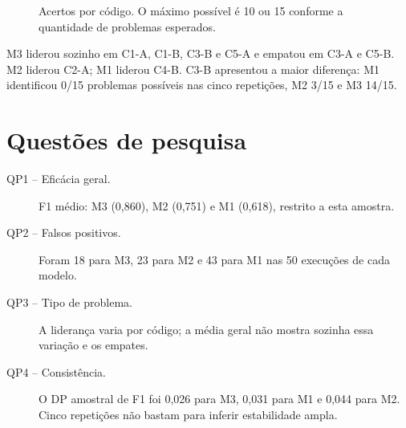 \documentclass[12pt,a4paper]{article}
\begin{document}
\begin{figure}[ht]
\centering
{}
\caption{Acertos por código. O máximo possível é 10 ou 15 conforme a quantidade de problemas esperados.}
\end{figure}

M3 liderou sozinho em C1-A, C1-B, C3-B e C5-A e empatou em C3-A e C5-B. M2 liderou C2-A; M1 liderou C4-B. C3-B apresentou a maior diferença: M1 identificou 0/15 problemas possíveis nas cinco repetições, M2 3/15 e M3 14/15.

\section{Questões de pesquisa}
\begin{description}
\item[QP1 -- Eficácia geral.] F1 médio: M3 (0,860), M2 (0,751) e M1 (0,618), restrito a esta amostra.
\item[QP2 -- Falsos positivos.] Foram 18 para M3, 23 para M2 e 43 para M1 nas 50 execuções de cada modelo.
\item[QP3 -- Tipo de problema.] A liderança varia por código; a média geral não mostra sozinha essa variação e os empates.
\item[QP4 -- Consistência.] O DP amostral de F1 foi 0,026 para M3, 0,031 para M1 e 0,044 para M2. Cinco repetições não bastam para inferir estabilidade ampla.
\end{description}
\end{document}
